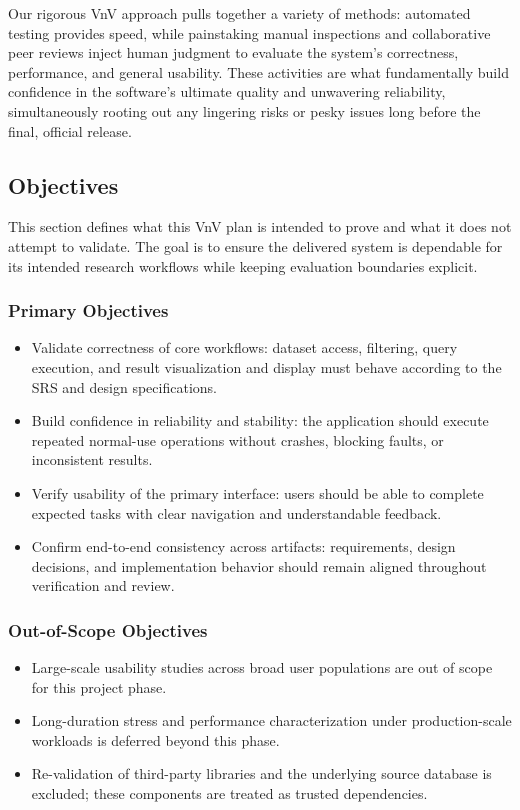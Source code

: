 \documentclass[12pt, titlepage]{article}
\begin{document}
Our rigorous VnV approach pulls together a variety of methods: automated testing provides speed, while painstaking manual
 inspections and collaborative peer reviews inject human judgment to evaluate the system's correctness, performance, and 
 general usability. These activities are what fundamentally build confidence in the software's ultimate quality and 
 unwavering reliability, simultaneously rooting out any lingering risks or pesky issues long before the final, official 
 release.


\subsection{Objectives}

This section defines what this VnV plan is intended to prove and what it does not attempt to validate. The goal is to ensure the delivered system is dependable for its intended research workflows while keeping evaluation boundaries explicit.

\subsubsection{Primary Objectives}
\begin{itemize}
  \item Validate correctness of core workflows: dataset access, filtering, query execution, and result visualization and display must behave according to the SRS and design specifications.
  \item Build confidence in reliability and stability: the application should execute repeated normal-use operations without crashes, blocking faults, or inconsistent results.
  \item Verify usability of the primary interface: users should be able to complete expected tasks with clear navigation and understandable feedback.
  \item Confirm end-to-end consistency across artifacts: requirements, design decisions, and implementation behavior should remain aligned throughout verification and review.
\end{itemize}

\subsubsection{Out-of-Scope Objectives}
\begin{itemize}
  \item Large-scale usability studies across broad user populations are out of scope for this project phase.
  \item Long-duration stress and performance characterization under production-scale workloads is deferred beyond this phase.
  \item Re-validation of third-party libraries and the underlying source database is excluded; these components are treated as trusted dependencies.
\end{itemize}
\end{document}
